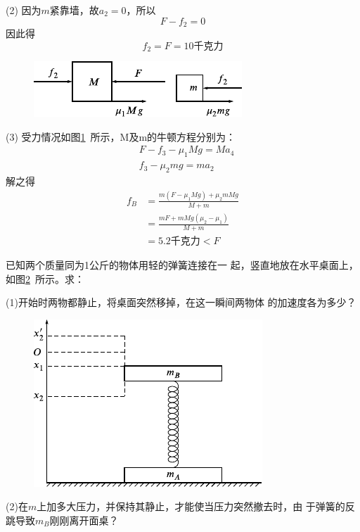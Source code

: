 (2) 因为$ m $紧靠墙，故$ a _ { 2 } = 0 $，所以
\begin{equation*}
  F - f _ { 2 } = 0
\end{equation*}
因此得
\begin{equation*}
  f _ { 2 } = F = 1 0 \text{千克力}
\end{equation*}

\begin{figure}
  \centering
  \includegraphics{figure/fig03.10}
  \caption{}
  \label{fig:03.10}
\end{figure}
(3) 受力情况如图\ref{fig:03.10}~所示，M及m的牛顿方程分别为：
{\setlength{\mathindent}{2em}
\begin{align*}
   & F - f _ { 3 } - \mu _ { 1 } M g = M a _ { 4 } \\
   & f _ { 3 } - \mu _ { 2 } m g = m a _ { 2 }
\end{align*}}
解之得
\begin{align*}
  f _ { B } & = \frac { m \left( F - \mu _ { 1 } M g \right) + \mu _ { 2 } m M g } { M + m } \\
            & = \frac { m F + m M g \left( \mu _ { 2 } - \mu _ { 1 } \right) } { M + m }     \\
            & = 5.2 \text{千克力} < F
\end{align*}

\example 已知两个质量同为1公斤的物体用轻的弹簧连接在一
起，竖直地放在水平桌面上，如图\ref{fig:03.11}~所示。求：

(1)开始时两物都静止，将桌面突然移掉，在这一瞬间两物体
的加速度各为多少？

\begin{figure}
  \centering
  \includegraphics{figure/fig03.11}
  \caption{}
  \label{fig:03.11}
\end{figure}
(2)在$ m $上加多大压力，并保持其静止，才能使当压力突然撤去时，由
于弹簧的反跳导致$ m_B $刚刚离开面桌？

